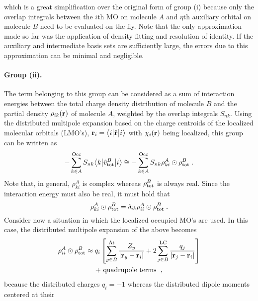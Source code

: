 %
which is a great simplification over the original form of group (i)
because only the overlap integrals between the $i$th MO on molecule $A$
and $\eta$th auxiliary orbital on molecule $B$ need to be evaluated on the fly.
Note that the only approximation made so far was the application of density fitting
and resolution of identity. If the auxiliary and intermediate
basis sets are sufficiently large, the errors
due to this approximation can be minimal and negligible.



\paragraph{Group (ii).}
The term belonging to this group can be considered as a sum of interaction
energies between the total charge density distribution of molecule $B$
and the partial density $\rho_{ik}({\bf r})$ of molecule $A$,
weighted by the overlap integrals $S_{nk}$. Using the distributed multipole 
expansion based on the charge centroids of the localized molecular orbitals (LMO's),
${\bf r}_i = \bigl\langle {i} \bigl\lvert {\hat{\bf r}} \bigl\lvert {i} \bigr\rangle$ with $\chi_i({\bf r})$ being localized,
this group can be written as
%
\begin{equation} \label{e:ct.group-2}
      - \sum_{k\in A}^{\rm Occ} S_{nk}  \bigl\langle {k} \bigl\lvert {\hat{v}^B_{\rm tot} } \bigl\lvert {i} \bigr\rangle 
 \cong - \sum_{k\in A}^{\rm Occ} S_{nk} \rho_{ki}^A \odot \rho^B_{\rm tot} \;.
\end{equation}
%
Note that, in general, $\rho_{ki}^A$ is complex whereas $\rho^B_{\rm tot}$ is always real.
Since the interaction energy must also be real, it must hold that
%
\begin{equation} \label{e:ct.group-2-d}
 \rho_{ki}^A \odot \rho^B_{\rm tot} = \delta_{ik} \rho_{ii}^A \odot \rho^B_{\rm tot} \;.
\end{equation}
%
Consider now a situation in which the localized occupied MO's are used.
In this case, the distributed multipole expansion
of the above becomes
%
\begin{multline}
 \rho_{ii}^A \odot \rho^B_{\rm tot} 
 \approx 
 q_{i} 
 \left[
 \sum_{y\in B}^{\rm At}
  \frac{Z_y}{\vert {\bf r}_y - {\bf r}_i \vert } 
 +
 2\sum_{j\in B}^{\rm LC}
  \frac{q_j}{\vert {\bf r}_j - {\bf r}_i \vert } 
 \right] \\
 + \text{ quadrupole terms } \;,
\end{multline}
%
because the distributed charges
$q_i = -1$ whereas the distributed dipole moments %
centered at their
